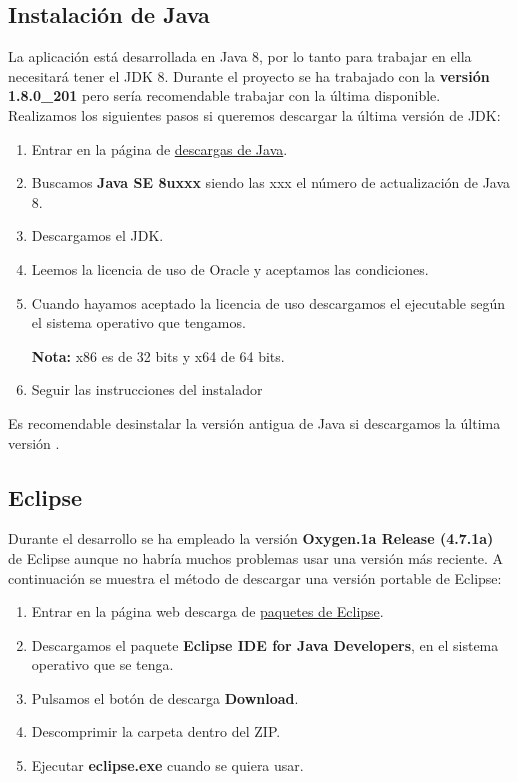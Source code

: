\subsection{Instalación de Java}

La aplicación está desarrollada en Java 8, por lo tanto para trabajar en ella necesitará tener el JDK 8. Durante el proyecto se ha trabajado con la \textbf{versión 1.8.0\_201} pero sería recomendable trabajar con la última disponible. Realizamos los siguientes pasos si queremos descargar la última versión de JDK: 

\begin{enumerate}
	\item Entrar en la página de  \href{https://www.oracle.com/technetwork/java/javase/downloads/index.html}{descargas de Java}.
	\item Buscamos \textbf{Java SE 8uxxx} siendo las xxx el número de actualización de Java 8. 
	\item Descargamos el JDK.
	\item Leemos la licencia de uso de Oracle y aceptamos las condiciones.
	\item Cuando hayamos aceptado la licencia de uso descargamos el ejecutable según el sistema operativo que tengamos.
	
	\textbf{Nota:} x86 es de 32 bits y x64 de 64 bits.
	\item Seguir las instrucciones del instalador
	
	
\end{enumerate}

Es recomendable desinstalar la versión antigua de Java si descargamos la última versión \cite{noauthor_por_nodate}.
\subsection{Eclipse}

Durante el desarrollo se ha empleado la versión \textbf{Oxygen.1a Release (4.7.1a)} de Eclipse aunque no habría muchos problemas usar una versión más reciente. A continuación se muestra el método de descargar una versión portable de Eclipse:

\begin{enumerate}
	\item  Entrar en la página web descarga de \href{https://www.eclipse.org/downloads/packages/}{paquetes de Eclipse}.
	\item Descargamos el paquete \textbf{Eclipse IDE for Java Developers}, en el sistema operativo que se tenga.
	\item Pulsamos el botón de descarga \textbf{Download}.
	\item Descomprimir la carpeta dentro del ZIP.
	\item Ejecutar \textbf{eclipse.exe} cuando se quiera usar.
\end{enumerate}


